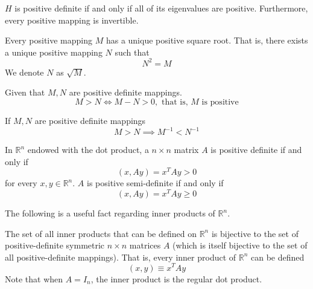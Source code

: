   \begin{theorem}
    $H$ is positive definite if and only if all of its eigenvalues are positive. Furthermore, every positive mapping is invertible.
  \end{theorem}

  \begin{theorem}
    Every positive mapping $M$ has a unique positive square root. That is, there exists a unique positive mapping $N$ such that
    \begin{equation}
      N^2 = M 
    \end{equation}
    We denote $N$ as $\sqrt{M}$. 
  \end{theorem}

  \begin{definition}
    Given that $M, N$ are positive definite mappings. 
    \begin{equation}
      M > N \iff M - N > 0, \text{ that is, $M$ is positive}
    \end{equation}
  \end{definition}

  \begin{theorem}
    If $M, N$ are positive definite mappings 
    \begin{equation}
       M > N \implies M^{-1} < N^{-1}
    \end{equation}
  \end{theorem}

  \begin{proposition}
    In $\mathbb{R}^n$ endowed with the dot product, a $n \times n$ matrix $A$ is positive definite if and only if 
    \begin{equation}
      (x, A y) = x^T A y > 0 
    \end{equation}
    for every $x, y \in \mathbb{R}^n$. $A$ is positive semi-definite if and only if 
    \begin{equation}
      (x, A y) = x^T A y \geq 0
    \end{equation}
  \end{proposition}

  The following is a useful fact regarding inner products of $\mathbb{R}^n$. 

  \begin{proposition}
    The set of all inner products that can be defined on $\mathbb{R}^n$ is bijective to the set of positive-definite symmetric $n \times n$ matrices $A$ (which is itself bijective to the set of all positive-definite mappings). That is, every inner product of $\mathbb{R}^n$ can be defined 
    \begin{equation}
      (x, y) \equiv x^T A y
    \end{equation}
    Note that when $A = I_n$, the inner product is the regular dot product.
  \end{proposition}

